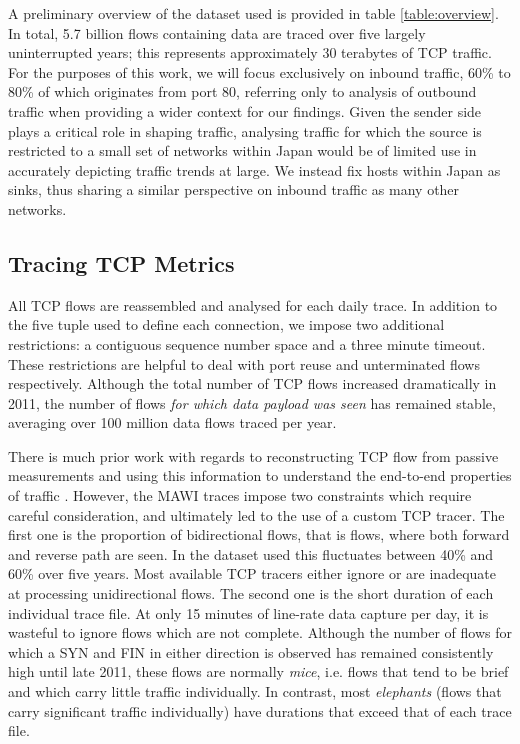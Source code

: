 A preliminary overview of the dataset used is provided in table \ref{table:overview}. 
In total, 5.7 billion flows containing data are traced over five largely uninterrupted years; this represents approximately 30 terabytes of \ac{TCP} traffic. For the purposes of this work, we will focus exclusively on inbound traffic, 60\% to 80\% of which originates from port 80, referring only to analysis of outbound traffic when providing a wider context for our findings.
Given the sender side plays a critical role in shaping traffic, analysing traffic for which the source is restricted to a small set of networks within Japan would be of limited use in accurately depicting traffic trends at large.
We instead fix hosts within Japan as sinks, thus sharing a similar perspective on inbound traffic as many other networks. 

\subsection{Tracing \ac{TCP} Metrics}

All \ac{TCP} flows are reassembled and analysed for each daily trace.
In addition to the five tuple used to define each connection, we impose two additional restrictions: a contiguous sequence number space and a three minute timeout. 
These restrictions are helpful to deal with port reuse and unterminated flows respectively.  
Although the total number of \ac{TCP} flows increased dramatically in 2011, the number of flows \emph{for which data payload was seen} has remained stable, averaging over 100 million data flows traced per year.  

There is much prior work with regards to reconstructing \ac{TCP} flow from passive measurements and using this information to understand the end-to-end properties of traffic \cite{firstRTT,Jaiswal:2007p233,Rewaskar:2007p195,Shakkottai:2004p408}. 
However, the \ac{MAWI} traces impose two constraints which require careful consideration, and ultimately led to the use of a custom \ac{TCP} tracer. 
The first one is the proportion of bidirectional flows, that is flows, where both forward and reverse path are seen. 
In the dataset used this fluctuates between 40\% and 60\% over five years.
Most available \ac{TCP} tracers either ignore or are inadequate at processing unidirectional flows. 
The second one is the short duration of each individual trace file. 
At only 15 minutes of line-rate data capture per day, it is wasteful to ignore flows which are not complete. 
Although the number of flows for which a SYN and FIN in either direction is observed has remained consistently high until late 2011, these flows are normally \emph{mice}, i.e. flows that tend to be brief and which carry little traffic individually. 
In contrast, most \emph{elephants} (flows that carry significant traffic individually) have durations that exceed that of each trace file. 


